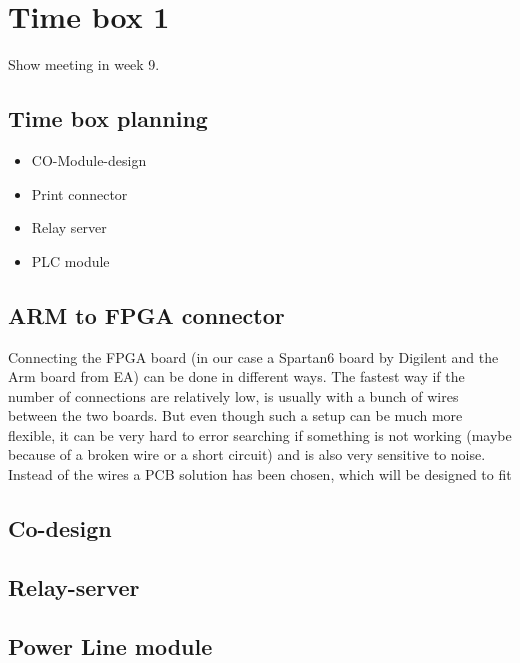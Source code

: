 \section{Time box 1}
Show meeting in week 9.
\subsection{Time box planning}

\begin{itemize}
	\item CO-Module-design
	\item Print connector
	\item Relay server
	\item PLC module
\end{itemize}

\subsection{ARM to FPGA connector}
Connecting the FPGA board (in our case a Spartan6 board by Digilent and the Arm board from EA) can be done in different ways. The fastest way if the number of connections are relatively low, is usually with a bunch of wires between the two boards. But even though such a setup can be much more flexible, it can be very hard to error searching if something is not working (maybe because of a broken wire or a short circuit) and is also very sensitive to noise. Instead of the wires a PCB solution has been chosen, which will be designed to fit 

\subsection{Co-design}

\subsection{Relay-server}

\subsection{Power Line module}